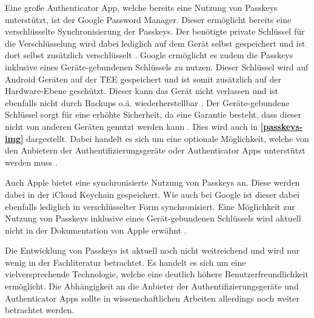Eine große Authenticator App, welche bereits eine Nutzung von Passkeys unterstützt, ist der Google Password Manager. Dieser ermöglicht bereits eine verschlüsselte Synchronisierung der Passkeys. Der benötigte private Schlüssel für die Verschlüsselung wird dabei lediglich auf dem Gerät selbst gespeichert und ist dort selbst zusätzlich verschlüsselt \cite{passkeysgoogle}. Google ermöglicht es zudem die Passkeys inklusive eines Geräte-gebundenen Schlüssels zu nutzen. Dieser Schlüssel wird auf Android Geräten auf der \ac{TEE} gespeichert und ist somit zusätzlich auf der Hardware-Ebene geschützt. Dieser kann das Gerät nicht verlassen und ist ebenfalls nicht durch Backups o.ä. wiederherstellbar \cite{passkeysgoogle}. Der Geräte-gebundene Schlüssel sorgt für eine erhöhte Sicherheit, da eine Garantie besteht, dass dieser nicht von anderen Geräten genutzt werden kann \cite{usecasfido}. Dies wird auch in \textbf{\ref{passkeys-img}} dargestellt. Dabei handelt es sich um eine optionale Möglichkeit, welche von den Anbietern der Authentifizierungsgeräte oder Authenticator Apps unterstützt werden muss \cite{usecasfido}.

Auch Apple bietet eine synchronisierte Nutzung von Passkeys an. Diese werden dabei in der iCloud Keychain gespeichert. Wie auch bei Google ist dieser dabei ebenfalls lediglich in verschlüsselter Form synchronisiert. Eine Möglichkeit zur Nutzung von Passkeys inklusive eines Gerät-gebundenen Schlüssels wird aktuell nicht in der Dokumentation von Apple erwähnt \cite{passkeysapple}.

Die Entwicklung von Passkeys ist aktuell noch nicht weitreichend und wird nur wenig in der Fachliteratur betrachtet. Es handelt es sich um eine vielversprechende Technologie, welche eine deutlich höhere Benutzerfreundlichkeit ermöglicht. Die Abhängigkeit an die Anbieter der Authentifizierungsgeräte und Authenticator Apps sollte in wissenschaftlichen Arbeiten allerdings noch weiter betrachtet werden. 







